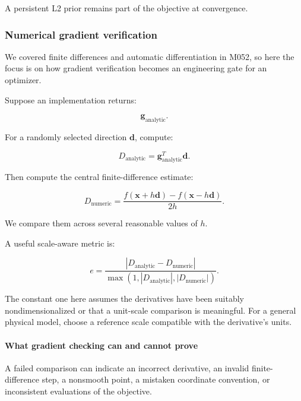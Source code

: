 A persistent L2 prior remains part of the objective at convergence.

\subsubsection{Numerical gradient verification}\label{02-foundations-ii-ch027-numerical-gradient-verification}

\hypertarget{02-foundations-ii-ch027-numerical-gradient-verification}{}

We covered finite differences and automatic differentiation in M052, so here the focus is on how gradient verification becomes an engineering gate for an optimizer.

Suppose an implementation returns:

\[
\mathbf g_{\mathrm{analytic}}.
\]

For a randomly selected direction \(\mathbf d\), compute:

\[
D_{\mathrm{analytic}} = \mathbf g_{\mathrm{analytic}}^T\mathbf d.
\]

Then compute the central finite-difference estimate:

\[
D_{\mathrm{numeric}} = \frac{ f(\mathbf x+h\mathbf d) - f(\mathbf x-h\mathbf d) }{2h}.
\]

We compare them across several reasonable values of \(h\).

A useful scale-aware metric is:

\[
\boxed{ e= \frac{ |D_{\mathrm{analytic}}-D_{\mathrm{numeric}}| }{ \max(1,|D_{\mathrm{analytic}}|,|D_{\mathrm{numeric}}|) } }.
\]

The constant one here assumes the derivatives have been suitably nondimensionalized or that a unit-scale comparison is meaningful. For a general physical model, choose a reference scale compatible with the derivative's units.

\paragraph{What gradient checking can and cannot prove}\label{02-foundations-ii-ch027-what-gradient-checking-can-and-cannot-prove}

\hypertarget{02-foundations-ii-ch027-what-gradient-checking-can-and-cannot-prove}{}

A failed comparison can indicate an incorrect derivative, an invalid finite-difference step, a nonsmooth point, a mistaken coordinate convention, or inconsistent evaluations of the objective.

